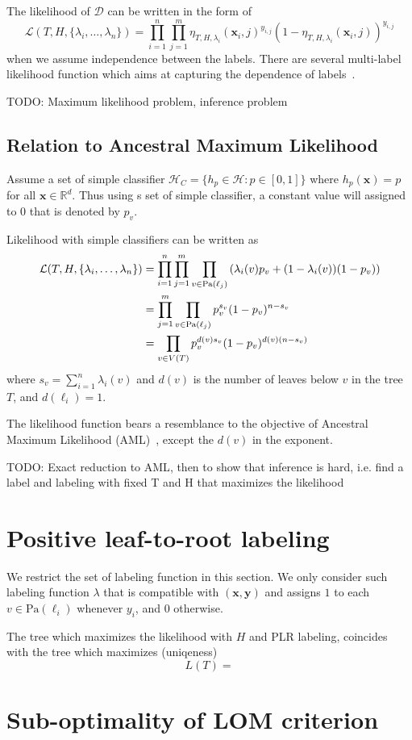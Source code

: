\documentclass{article}
\newcommand{\R}{\mathbb{R}}
\newcommand{\cD}{\mathcal{D}}
\newcommand{\cH}{\mathcal{H}}
\newcommand{\cL}{\mathcal{L}}
\newcommand{\path}{\text{Pa}}
\newcommand{\leaves}{d}
\renewcommand{\vec}[1]{\mathbf{#1}}
\newcommand{\bx}{\mathbf{x}}
\newcommand{\by}{\vec{y}}
\newcommand{\Algo}[1]{\textsc{#1}}
\begin{document}
The likelihood of $\cD$ can be written in the form of
\[
\cL ( T, H, \{ \lambda_i, \dots, \lambda_n\} ) = \prod_{i=1}^{n} \prod_{j=1}^m \eta_{T,H,\lambda_i} ( \bx_i , j )^{y_{i,j}} (1-\eta_{T,H,\lambda_i} ( \bx_i , j ))^{y_{i,j}}
\]
when we assume independence between the labels. There are several multi-label likelihood function which aims at capturing the dependence of labels~\citep{ZhangS12}. 

TODO: Maximum likelihood problem, inference problem

\subsection{Relation to Ancestral Maximum Likelihood}

Assume a set of simple classifier $\cH_{C} = \{h_p\in \cH : p\in [0,1] \}$ where $h_p(\bx) = p$ for all $\bx \in \R^d$. Thus using s set of simple classifier, a constant value will assigned to $0$ that is denoted by $p_v$.

Likelihood with simple classifiers can be written as
\begin{align}
\cL ( T, H, \{ \lambda_i, \dots, \lambda_n\} ) 
  & = \prod_{i=1}^{n} \prod_{j=1}^m \prod_{v \in \path(\ell_j)} \left( \lambda_i (v) p_v + (1-\lambda_i (v) ) (1-p_v) \right) \notag \\
  & = \prod_{j=1}^m \prod_{v \in \path(\ell_j)} p_{v}^{s_v} (1-p_v)^{n-s_v} \notag \\
  & = \prod_{v \in V(T)} p_{v}^{\leaves (v) s_v} (1-p_v)^{\leaves (v)(n-s_v)} \notag
\end{align}
where $s_v = \sum_{i=1}^n \lambda_i (v)$ and $\leaves (v)$ is the number of leaves below $v$ in the tree $T$, and $\leaves( \ell_i ) = 1$.

The likelihood function bears a resemblance to the objective of Ancestral Maximum Likelihood (\Algo{AML})~\citep{Alon2010}, except the $d(v)$ in the exponent.

TODO: Exact reduction to \Algo{AML}, then to show that inference is hard, i.e. find a label and labeling with fixed T and H that maximizes the likelihood

\section{Positive leaf-to-root labeling}

We restrict the set of labeling function in this section. We only consider such labeling function $\lambda$ that is compatible with $(\bx, \by )$ and assigns $1$ to each $v\in \path(\ell_i)$ whenever $y_i$, and $0$ otherwise.

The tree which maximizes the likelihood with $H$ and PLR labeling, coincides with the tree which maximizes (uniqeness)
\[
L(T)=
\]

\section{Sub-optimality of \Algo{LOM} criterion}



\end{document}
